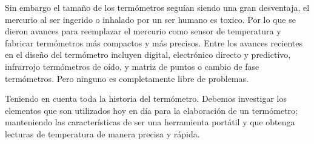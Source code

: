 \par \noindent
Sin embargo el tamaño de los termómetros seguían siendo una gran desventaja, el mercurio al ser ingerido o inhalado por un ser humano es toxico. Por lo que se dieron avances para reemplazar el mercurio como sensor de temperatura y fabricar termómetros más compactos y más precisos. Entre los avances recientes en el diseño del termómetro incluyen digital, electrónico directo y predictivo, infrarrojo termómetros de oído, y matriz de puntos o cambio de fase termómetros. Pero ninguno es completamente libre de problemas.\cite{intro-historia}

\par \noindent
Teniendo en cuenta toda la historia del termómetro. Debemos investigar los elementos que son utilizados hoy en día para la elaboración de un termómetro; manteniendo las características de ser una herramienta portátil y que obtenga lecturas de temperatura de manera precisa y rápida.